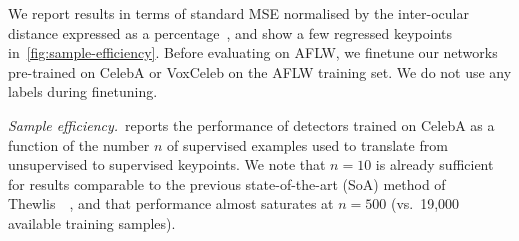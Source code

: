 \documentclass{article}
\begin{document}
We report results in terms of standard MSE normalised by the inter-ocular distance expressed as a percentage~\citep{Zhang2016}, and show a few regressed keypoints in~\cref{fig:sample-efficiency}.
Before evaluating on AFLW, we finetune our networks pre-trained on CelebA or VoxCeleb on the AFLW training set. We do not use any labels during finetuning.

\emph{Sample efficiency.}~reports the performance of detectors trained on CelebA as a function of the number $n$ of supervised examples used to translate from unsupervised to supervised keypoints. We note that $n=10$ is already sufficient for results comparable to the previous state-of-the-art (SoA) method of Thewlis~\etal~\cite{thewlis17unsupervised}, and that performance almost saturates at $n = 500$ (vs.~19,000 available training samples). %
\end{document}
